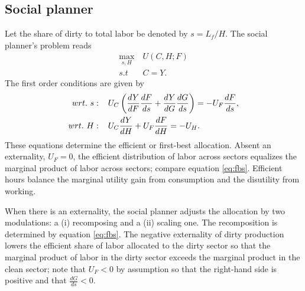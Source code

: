 \subsection{Social planner}
Let the share of dirty to total labor be denoted by $s=L_f/H$. The social planner's problem reads
\begin{align}
\underset{s, H}{\max}\ & U(C,H; F)\\ s.t\ \ & C=Y.
\end{align}
The first order conditions are given by
\begin{align}
wrt.\ s:\hspace{4mm} & U_C\left(\frac{dY}{dF}\frac{dF}{ds}+\frac{dY}{dG}\frac{dG}{ds}\right)=-U_F\frac{dF}{ds}, \label{eq:fbs}
\\
wrt.\ H:\hspace{4mm} & U_C\frac{dY}{dH}+U_F\frac{dF}{dH}=-U_H\label{eq:fbh}. 
\end{align}
These equations determine the efficient or first-best allocation. 
Absent an externality, $U_F=0$, the efficient distribution of labor across sectors equalizes the marginal product of labor across sectors; compare equation \ref{eq:fbs}. Efficient hours balance the marginal utility gain from consumption and the disutility from working. 

When there is an externality, the social planner adjusts the allocation by two modulations: a (i) recomposing and a (ii) scaling one. 
The recomposition is determined by equation \ref{eq:fbs}.
The negative externality of dirty production  lowers the efficient share of labor allocated to  the dirty sector so that the marginal product of labor in the dirty sector exceeds the marginal product in the clean sector; note that $U_F<0$ by assumption so that the right-hand side is positive and that $\frac{dG}{ds}<0$.
\begin{comment}
The equation 
\begin{align}
\frac{-U_F}{U_C \frac{dY}{dF}}=1+\frac{\frac{dY}{dG}\frac{dG}{ds}}{\frac{dY}{dF}\frac{dF}{ds}}.
\end{align}
The term on the left-hand side is the social cost of the externality: it measures what the representative household is willing to pay for a further reduction in dirty production. 
\end{comment}

